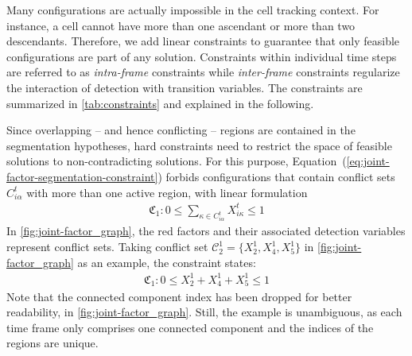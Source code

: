 Many configurations are actually impossible in the cell tracking context.  For instance, a cell
cannot have more than one ascendant or more than two descendants.
Therefore, we add linear constraints to guarantee that only feasible configurations are part
of any solution. Constraints %
within individual time steps are referred to as \emph{intra-frame} constraints
while \emph{inter-frame} constraints regularize the interaction of detection with transition variables.
The constraints are summarized in \cref{tab:constraints} and explained in the following.

Since overlapping -- and hence conflicting -- regions are contained in the segmentation hypotheses,
hard constraints need to restrict the space of feasible solutions to non-contradicting
solutions. For this purpose, Equation~(\ref{eq:joint-factor-segmentation-constraint}) forbids
configurations that contain conflict sets $C_{i\alpha}^t$ with more than one active region, with
linear formulation
\begin{align}
    \mathfrak{C}_1 : 0 \le \sum_{\kappa \in C_{i\alpha}^t}X_{i\kappa}^t \le 1
\end{align}
In \cref{fig:joint-factor_graph}, the red factors and their associated detection variables
represent conflict sets. Taking conflict set $\mathcal{C}_2^1 = \{ X_2^1, X_4^1, X_5^1 \}$ in
\cref{fig:joint-factor_graph} as an example, the constraint states:
\begin{align}
    \mathfrak{C}_1 : 0 \le X_2^1 + X_4^1 + X_5^1 \le 1
\end{align}
Note that the connected component index has been dropped for better readability, in
\cref{fig:joint-factor_graph}. Still, the example is unambiguous, as each time frame only comprises
one connected component and the indices of the regions are unique.

